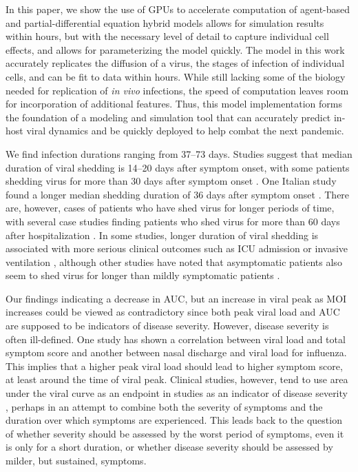 In this paper, we show the use of GPUs to accelerate computation of agent-based and partial-differential equation hybrid models allows for simulation results within hours, but with the necessary level of detail to capture individual cell effects, and allows for parameterizing the model quickly. The model in this work accurately replicates the diffusion of a virus, the stages of infection of individual cells, and can be fit to data within hours. While still lacking some of the biology needed for replication of \emph{in vivo} infections, the speed of computation leaves room for incorporation of additional features. Thus, this model implementation forms the foundation of a modeling and simulation tool that can accurately predict in-host viral dynamics and be quickly deployed to help combat the next pandemic.

We find infection durations ranging from 37--73 days. Studies suggest that median duration of viral shedding is 14--20 days after symptom onset, with some patients shedding virus for more than 30 days after symptom onset \cite{qi20, he20shed, zhou20, lee20}. One Italian study found a longer median shedding duration of 36 days after symptom onset \cite{mancuso20}. There are, however, cases of patients who have shed virus for longer periods of time, with several case studies finding patients who shed virus for more than 60 days after hospitalization \cite{park20, liu20, li20shed}. In some studies, longer duration of viral shedding is associated with more serious clinical outcomes such as ICU admission or invasive ventilation \cite{zeng20, lee20}, although other studies have noted that asymptomatic patients also seem to shed virus for longer than mildly symptomatic patients \cite{long20}.

Our findings indicating a decrease in AUC, but an increase in viral peak as MOI increases could be viewed as contradictory since both peak viral load and AUC are supposed to be indicators of disease severity. However, disease severity is often ill-defined. One study has shown a correlation between viral load and total symptom score \cite{chen12} and another between nasal discharge and viral load \cite{handel15} for influenza. This implies that a higher peak viral load should lead to higher symptom score, at least around the time of viral peak. Clinical studies, however, tend to use area under the viral curve as an endpoint in studies as an indicator of disease severity \cite{devincenzo20, hershberger19, stevens18, devincenzo15}, perhaps in an attempt to combine both the severity of symptoms and the duration over which symptoms are experienced. This leads back to the question of whether severity should be assessed by the worst period of symptoms, even it is only for a short duration, or whether disease severity should be assessed by milder, but sustained, symptoms.

